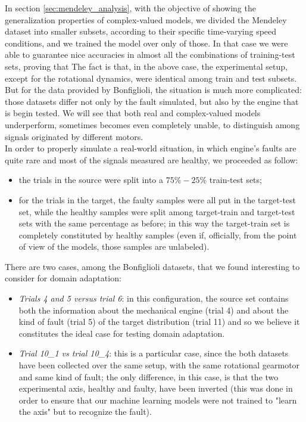 \documentclass[../main.tex]{subfiles}
\begin{document}
In section \ref{sec:mendeley_analysis}, with the objective of showing the generalization properties of complex-valued models, we divided the Mendeley dataset into smaller subsets, according to their specific time-varying speed conditions, and we trained the model over only of those. In that case we were able to guarantee nice accuracies in almost all the combinations of training-test sets, proving that 
The fact is that, in the above case, the experimental setup, except for the rotational dynamics, were identical among train and test subsets. But for the data provided by Bonfiglioli, the situation is much more complicated: those datasets differ not only by the fault simulated, but also by the engine that is begin tested. We will see that both real and complex-valued models underperform, sometimes becomes even completely unable, to distinguish among signals originated by different motors.\\
In order to properly simulate a real-world situation, in which engine's faults are quite rare and most of the signals measured are healthy, we proceeded as follow:
\begin{itemize}
	\item the trials in the source were split into a $75\%-25\%$ train-test sets;
	\item for the trials in the target, the faulty samples were all put in the target-test set, while the healthy samples were split among target-train and target-test sets with the same percentage as before; in this way the target-train set is completely constituted by healthy samples (even if, officially, from the point of view of the models, those samples are unlabeled). 
\end{itemize}
There are two cases, among the Bonfiglioli datasets, that we found interesting to consider for domain adaptation:
\begin{itemize}
	\item \textit{Trials 4 and 5 versus trial 6}: in this configuration, the source set contains both the information about the mechanical engine (trial 4) and about the kind of fault (trial 5) of the target distribution (trial 11) and so we believe it constitutes the ideal case for testing domain adaptation.
	\item \textit{Trial 10\_1 vs trial 10\_4}: this is a particular case, since the both datasets have been collected over the same setup, with the same rotational gearmotor and same kind of fault; the only difference, in this case, is that the two experimental axis, healthy and faulty, have been inverted (this was done in order to ensure that our machine learning models were not trained to "learn the axis" but to recognize the fault).
\end{itemize}
\end{document}
